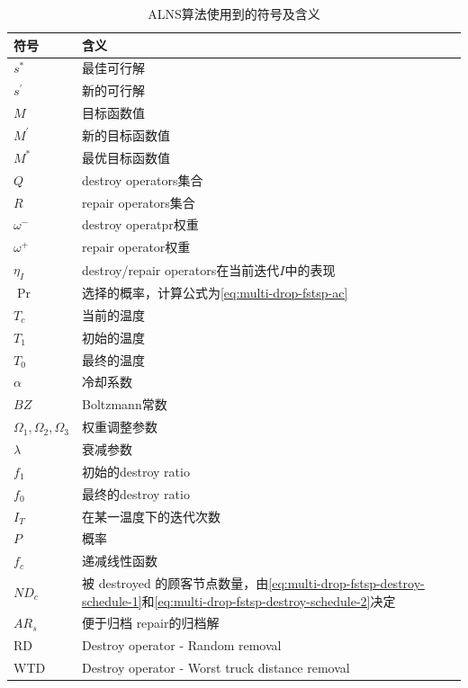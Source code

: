 \begin{table}[!htbp]
    \centering
    \caption{ALNS算法使用到的符号及含义}
    \label{tab:multi-drop-fstsp-alns-sign-meaning}
    \begin{tabularx}{\textwidth}{lX}
        \toprule[1pt]
        符号 & 含义 \\
        \midrule[0.75pt]
        $s^*$ & 最佳可行解\\
        $s^\prime$ & 新的可行解\\ 
        $M$ & 目标函数值\\
        $M^\prime$ & 新的目标函数值\\
        $M^*$ & 最优目标函数值\\ 
        $Q$ & destroy operators集合\\ 
        $R$ & repair operators集合\\
        $\omega^-$ & destroy operatpr权重\\
        $\omega^+$ & repair operator权重\\
        $\eta_I$ & destroy/repair operators在当前迭代$I$中的表现\\ 
        $\Pr$ & 选择的概率，计算公式为\ref{eq:multi-drop-fstsp-ac}\\
        $T_c$ & 当前的温度 \\
        $T_1$ & 初始的温度 \\
        $T_0$ & 最终的温度 \\ 
        $\alpha$ & 冷却系数\\ 
        $BZ$ & Boltzmann常数\\ 
        $\Omega_1, \Omega_2, \Omega_3$ & 权重调整参数\\
        $\lambda$ & 衰减参数\\
        $f_1$ & 初始的destroy ratio\\
        $f_0$ & 最终的destroy ratio\\
        $I_T$ & 在某一温度下的迭代次数\\ 
        $P$ & 概率\\
        $f_c$ & 递减线性函数\\ 
        $ND_c$ & 被 destroyed 的顾客节点数量，由\ref{eq:multi-drop-fstsp-destroy-schedule-1}和\ref{eq:multi-drop-fstsp-destroy-schedule-2}决定\\ 
        $AR_s$ & 便于归档 repair的归档解\\ 
        RD & Destroy operator - Random removal\\ 
        WTD & Destroy operator - Worst truck distance removal\\

\end{tabularx}
\end{table}
